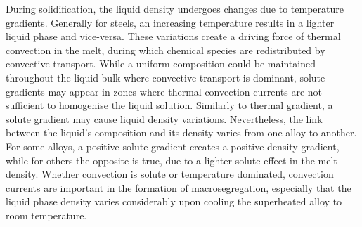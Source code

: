 During solidification, the liquid density undergoes changes due to temperature gradients.
Generally for steels, an increasing temperature results in a lighter liquid phase and vice-versa.
These variations create a driving force of thermal convection in the melt, during which 
chemical species are redistributed by convective transport. While a uniform composition
could be maintained throughout the liquid bulk where convective transport is dominant, 
solute gradients may appear in zones where thermal convection currents are not sufficient to homogenise the liquid solution. 
Similarly to thermal gradient, a solute gradient may cause liquid density variations.
Nevertheless, the link between the liquid's composition and its density varies from one alloy to another. 
For some alloys, a positive solute gradient creates a positive density gradient, while
for others the opposite is true, due to a lighter solute effect in the melt density. Whether convection is solute or temperature
dominated, convection currents are important in the formation of macrosegregation, especially that the
liquid phase density varies considerably upon cooling the superheated alloy to room temperature.

%
%
%
%
% 

